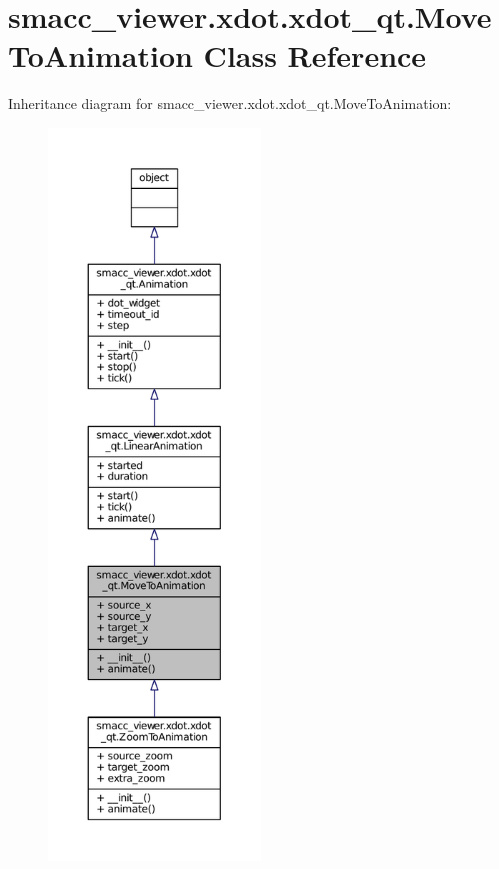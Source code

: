 \hypertarget{classsmacc__viewer_1_1xdot_1_1xdot__qt_1_1MoveToAnimation}{}\section{smacc\+\_\+viewer.\+xdot.\+xdot\+\_\+qt.\+Move\+To\+Animation Class Reference}
\label{classsmacc__viewer_1_1xdot_1_1xdot__qt_1_1MoveToAnimation}


Inheritance diagram for smacc\+\_\+viewer.\+xdot.\+xdot\+\_\+qt.\+Move\+To\+Animation\+:
\nopagebreak
\begin{figure}[H]
\begin{center}
\leavevmode
\includegraphics[height=550pt]{classsmacc__viewer_1_1xdot_1_1xdot__qt_1_1MoveToAnimation__inherit__graph}
\end{center}
\end{figure}


